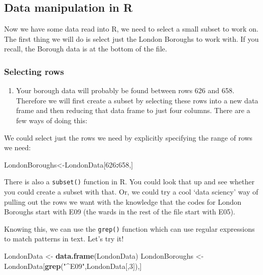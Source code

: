 \documentclass[]{book}
\newenvironment{Shaded}{\begin{snugshade}}{\end{snugshade}}
\newcommand{\DecValTok}[1]{\textcolor[rgb]{0.00,0.00,0.81}{#1}}
\newcommand{\KeywordTok}[1]{\textcolor[rgb]{0.13,0.29,0.53}{\textbf{#1}}}
\newcommand{\NormalTok}[1]{#1}
\newcommand{\OperatorTok}[1]{\textcolor[rgb]{0.81,0.36,0.00}{\textbf{#1}}}
\newcommand{\StringTok}[1]{\textcolor[rgb]{0.31,0.60,0.02}{#1}}
\providecommand{\tightlist}{%
  \setlength{\itemsep}{0pt}\setlength{\parskip}{0pt}}
\begin{document}
\hypertarget{data-manipulation-in-r}{%
\subsection{Data manipulation in R}\label{data-manipulation-in-r}}

Now we have some data read into R, we need to select a small subset to work on. The first thing we will do is select just the London Boroughs to work with. If you recall, the Borough data is at the bottom of the file.

\hypertarget{selecting-rows}{%
\subsubsection{Selecting rows}\label{selecting-rows}}

\begin{enumerate}
\def\labelenumi{\arabic{enumi}.}
\setcounter{enumi}{28}
\tightlist
\item
  Your borough data will probably be found between rows 626 and 658. Therefore we will first create a subset by selecting these rows into a new data frame and then reducing that data frame to just four columns. There are a few ways of doing this:
\end{enumerate}

We could select just the rows we need by explicitly specifying the range of rows we need:

\begin{Shaded}
\begin{Highlighting}[]
\NormalTok{LondonBoroughs<-LondonData[}\DecValTok{626}\OperatorTok{:}\DecValTok{658}\NormalTok{,]}
\end{Highlighting}
\end{Shaded}

There is also a \texttt{subset()} function in R. You could look that up and see whether you could create a subset with that. Or, we could try a cool `data sciency' way of pulling out the rows we want with the knowledge that the codes for London Boroughs start with E09 (the wards in the rest of the file start with E05).

Knowing this, we can use the \texttt{grep()} function which can use regular expressions to match patterns in text. Let's try it!

\begin{Shaded}
\begin{Highlighting}[]
\NormalTok{LondonData <-}\StringTok{ }\KeywordTok{data.frame}\NormalTok{(LondonData)}
\NormalTok{LondonBoroughs <-}\StringTok{ }\NormalTok{LondonData[}\KeywordTok{grep}\NormalTok{(}\StringTok{"^E09"}\NormalTok{,LondonData[,}\DecValTok{3}\NormalTok{]),]}
\end{Highlighting}
\end{Shaded}
\end{document}
